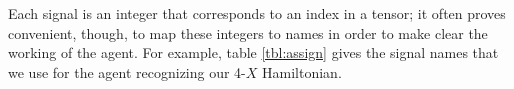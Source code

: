 \documentclass[12pt]{amsbook}
\theoremstyle{plain}
\theoremstyle{definition}
\theoremstyle{remark}
\begin{document}
Each signal is an integer that corresponds to an index in a tensor;  it often proves convenient, though, to map these integers to names in order to make clear the working of the agent.  For example, table \ref{tbl:assign} gives the signal names that we use for the agent recognizing our 4-$X$ Hamiltonian.

\begin{table}



\end{table}
\end{document}
